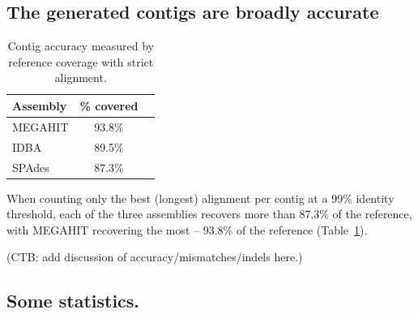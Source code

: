 \documentclass[10pt,a4paper,twocolumn]{article}
\begin{document}
%
%



\subsection*{The generated contigs are broadly accurate} 



\begin{table}[!h]
\centering
\caption{Contig accuracy measured by reference coverage with strict alignment.}
\begin{tabular}{|l|c|c|}\hline
\textbf{Assembly} & \textbf {\% covered}
  \\ \hline
MEGAHIT & 93.8\% \\ \hline
IDBA & 89.5\% \\ \hline
SPAdes &  87.3\% \\ \hline
\end{tabular}
\label{table:contig-accuracy}
\end{table}

When counting only the best (longest) alignment per contig at a 99\%
identity threshold, each of the three assemblies recovers more than 87.3\% of the
reference, with MEGAHIT recovering the most -- 93.8\% of the reference
(Table~\ref{table:contig-accuracy}).

(CTB: add discussion of accuracy/mismatches/indels here.)

\subsection*{Some statistics.}
\end{document}
